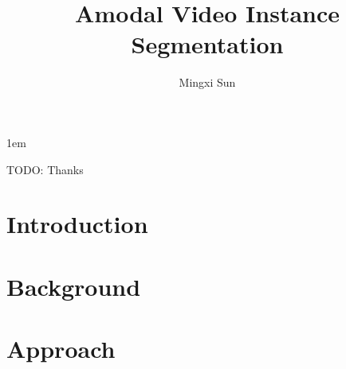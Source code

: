 \documentclass[tocnosub,noragright,centerchapter,fullpagesingle,12pt]{uiuc_csthesis21}
\title{Amodal Video Instance Segmentation}
\author{Mingxi Sun}
\theoremstyle{definition}
\numberwithin{algocf}{chapter}     %
\begin{document}
%

%
\maketitle

\parindent 1em%

\frontmatter

%
\begin{abstract}
\end{abstract}

%
\begin{dedication}
TODO: Thanks
\end{dedication}

%
\begin{acknowledgments}
\end{acknowledgments}

%
\tableofcontents

\mainmatter

%

\chapter{Introduction}
\label{chp:intro}

\chapter{Background}
\label{chp:bg}


\chapter{Approach}
\label{chp:approach}

\end{document}
